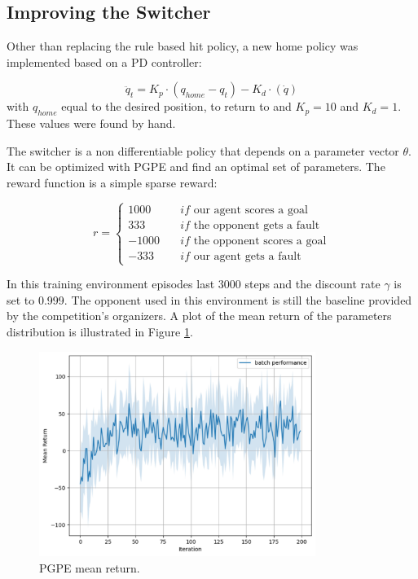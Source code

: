 \subsection{Improving the Switcher}
Other than replacing the rule based hit policy, a new home policy was implemented based on a PD controller:

\begin{equation*}
    \ddot{q}_t = K_p \cdot \left(q_{home} - q_t\right) - K_d \cdot \left(\dot{q}\right)
\end{equation*}
with $q_{home}$ equal to the desired position,  to return to and $K_p = 10$ and $K_d = 1$. These values were found by hand.

The switcher is a non differentiable policy that depends on a parameter vector $\theta$. It can be optimized with PGPE \cite{PGPE} and find an optimal set of parameters.
The reward function is a simple sparse reward:

\begin{equation*}
    r = \left\{
        \begin{aligned}
            1000 \quad &if \text{ our agent scores a goal} \\
            333 \quad &if \text{ the opponent gets a fault} \\
            -1000 \quad &if \text{ the opponent scores a goal} \\
            -333 \quad &if \text{ our agent gets a fault}
        \end{aligned}
    \right.
\end{equation*}

In this training environment episodes last 3000 steps and the discount rate $\gamma$ is set to 0.999.
The opponent used in this environment is still the baseline provided by the competition's organizers.
A plot of the mean return of the parameters distribution is illustrated in Figure \ref{fig:pgpe_return}.

\begin{figure}
    \centering
    \includegraphics[width=0.8\textwidth]{Images/pgpe_return.pdf}
    \caption{PGPE mean return.}
    \label{fig:pgpe_return}
\end{figure}